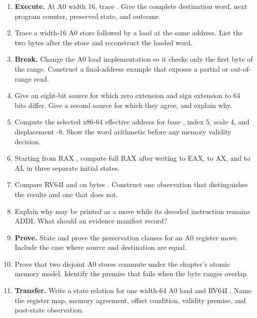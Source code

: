 \begin{enumerate}
\item \textbf{Execute.} At A0 width 16, trace . Give the
complete destination word, next program counter, preserved state, and outcome.

\item Trace a width-16 A0 store followed by a load at the same address. List
the two bytes after the store and reconstruct the loaded word.

\item \textbf{Break.} Change the A0 load implementation so it checks only
the first byte of the range. Construct a final-address example that exposes a
partial or out-of-range read.

\item Give an eight-bit source for which zero extension and sign extension to
64 bits differ. Give a second source for which they agree, and explain why.

\item Compute the selected x86-64 effective address for base ,
index 5, scale 4, and displacement -8. Show the word arithmetic before any
memory validity decision.

\item Starting from RAX , compute full RAX after
writing  to EAX,  to AX, and  to AL in
three separate initial states.

\item Compare RV64I  and  on bytes
. Construct one observation that distinguishes the results
and one that does not.

\item Explain why  may be printed as a move while its
decoded instruction remains ADDI. What should an evidence manifest record?

\item \textbf{Prove.} State and prove the preservation clauses for an A0
register move. Include the case where source and destination are equal.

\item Prove that two disjoint A0 stores commute under the chapter's atomic
memory model. Identify the premise that fails when the byte ranges overlap.

\item \textbf{Transfer.} Write a state relation for one width-64 A0 load and
RV64I . Name the register map, memory agreement, offset condition,
validity premise, and post-state observation.


\end{enumerate}

